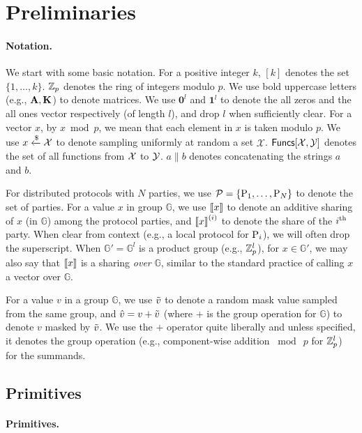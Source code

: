 
\section{Preliminaries}
\label{sec:preliminaries}

\paragraph{Notation.} We start with some basic notation.
For a positive integer $k$, $[k]$ denotes the set $\{1,\dots, k\}$. $\mathbb{Z}_p$ denotes the ring of integers modulo $p$. We use bold uppercase letters (e.g., $\mat{A}, \mat{K}$) to denote matrices. We use $\textbf{0}^l$ and $\textbf{1}^l$ to denote the all zeros and the all ones vector respectively (of length $l$), and drop $l$ when sufficiently clear. For a vector $x$, by $x \bmod p$, we mean that each element in $x$ is taken modulo $p$. We use $x \xleftarrow{\$} \mathcal{X}$ to denote sampling uniformly at random a set $\mathcal{X}$. $\mathsf{Funcs}[\mathcal{X}, \mathcal{Y}]$ denotes the set of all functions from $\mathcal{X}$ to $\mathcal{Y}$. $a \parallel b$ denotes concatenating the strings $a$ and $b$.

For distributed protocols with $N$ parties, we use $\mathcal{P} = \{\textnormal{P}_1, \dots, \textnormal{P}_N\}$ to denote the set of parties. For a value $x$ in group $\mathbb{G}$, we use $\left\llbracket x \right\rrbracket$ to denote an additive sharing of $x$ (in $\mathbb{G}$) among the protocol parties, and $\left\llbracket x \right\rrbracket^{(i)}$ to denote the share of the $i^{\textnormal{th}}$ party. When clear from context (e.g., a local protocol for $\textnormal{P}_i$), we will often drop the superscript. When $\mathbb{G}' =  \mathbb{G}^l$ is a product group (e.g., $\mathbb{Z}_p^l$), for $x \in \mathbb{G}'$, we may also say that $\left\llbracket x \right\rrbracket$ is a sharing \textit{over} $\mathbb{G}$, similar to the standard practice of calling $x$ a vector over $\mathbb{G}$.

For a value $v$ in a group $\mathbb{G}$, we use $\tilde{v}$ to denote a random mask value sampled from the same group, and $\hat{v} = v + \tilde{v}$ (where + is the group operation for $\mathbb{G}$) to denote $v$ masked by $\tilde{v}$. We use the $+$ operator quite liberally and unless specified, it denotes the group operation (e.g., component-wise addition $\bmod~p$ for $\mathbb{Z}_p^l$) for the summands.


\iffull\subsection{Primitives}\else\paragraph{Primitives.}\fi

